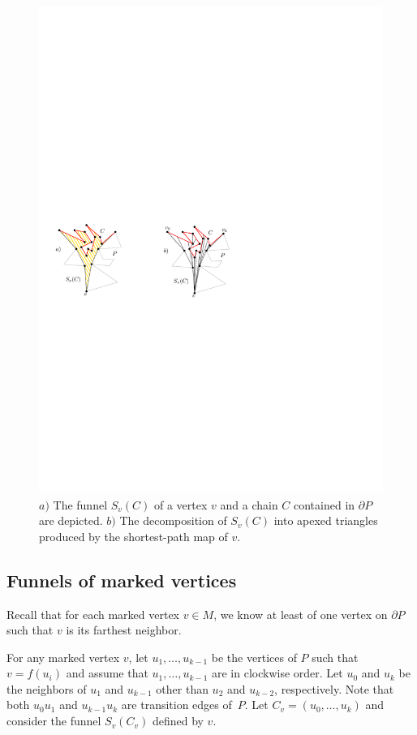 \documentclass[a4paper]{article}
\newcommand{\fn}[2]{\ensuremath{S_{\scriptscriptstyle #1}(#2)}}
\newcommand{\ff}[1]{\ensuremath{f(#1)}}
\begin{document}
\begin{figure}[tb]
\centering
\includegraphics{img/Funnel.pdf}
\caption{\small $a)$ The funnel $\fn{v}{C}$ of a vertex $v$ and a chain $C$ contained in $\partial P$ are depicted.
$b)$ The decomposition of $\fn{v}{C}$ into apexed triangles produced by the shortest-path map of $v$.}
\label{fig:Funnels and decomposition}
\end{figure}

\subsection{Funnels of marked vertices}
Recall that for each marked vertex $v\in M$, we know at least of one vertex on $\partial P$ such that $v$ is its farthest neighbor.

For any marked vertex $v$, let $u_1, \ldots, u_{k-1}$ be the vertices of $P$ such that $v = \ff{u_i}$ and assume that $u_1, \ldots, u_{k-1}$ are in clockwise order. Let $u_0$ and $u_k$ be the neighbors of $u_1$ and $u_{k-1}$ other than $u_2$ and $u_{k-2}$, respectively. Note that both $u_0 u_1$ and $u_{k-1}u_k$ are transition edges of~$P$. 
Let $C_v = (u_0, \ldots, u_k)$ and consider the funnel $\fn{v}{C_v}$ defined by $v$.
\end{document}
